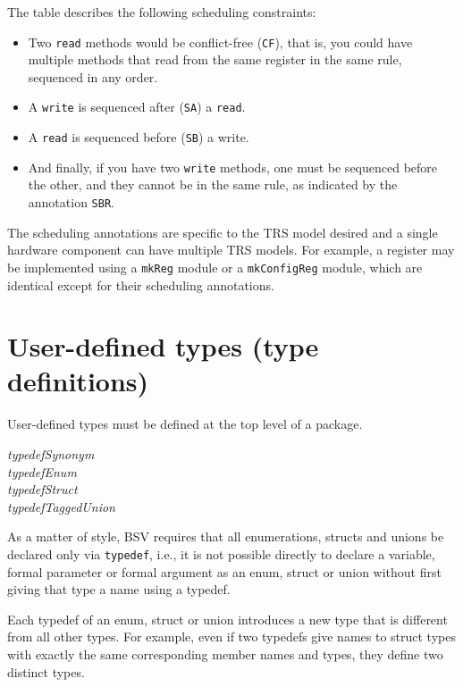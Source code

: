 \documentclass[twoside,letterpaper]{article}
\newcommand{\hm}{\hspace*{1em}}
\newcommand{\BSV}{BSV}
\newcommand{\te}[1]{\texttt{#1}}
\newcommand{\nterm}[1]{\emph{#1}}
\newcommand{\alt}{{$\mid$}}
\newcommand{\gram}[2]{    \hm\makebox[10em][l]{\it #1}\makebox[1.5em][l]{::=}    #2}
\newcommand{\gramalt}[1]{ \hm\makebox[10em][l]{      }\makebox[1.5em][l]{\alt}   #1}
\begin{document}
The table  describes the following scheduling constraints:
\begin{itemize}
\item Two \te{read} methods would be
conflict-free (\te{CF}), that is, you could have multiple methods that
read from the same register in the same rule, sequenced in any order.
\item A \te{write} is sequenced  after (\te{SA}) a \te{read}.
\item A \te{read} is sequenced before (\te{SB}) a write. 
\item And
finally, if you have two \te{write} methods, one must be sequenced
before the other, and they cannot be in the same rule, as indicated by
the annotation \te{SBR}.  
\end{itemize}

The scheduling annotations are specific to the TRS model desired and a
single hardware component can have multiple TRS models.  For example,
a register may be implemented using a \te{mkReg} module or a
\te{mkConfigReg} module, which are identical except for their
scheduling annotations.  

\section{User-defined types (type definitions)}

\label{sec-typedefs}
\index{typedef@\te{typedef} (keyword)}

User-defined types must be defined at the top level of  a package.

\gram{typeDef}{ \nterm{typedefSynonym} } \\
\gramalt      { \nterm{typedefEnum} }    \\
\gramalt      { \nterm{typedefStruct} }  \\
\gramalt      { \nterm{typedefTaggedUnion} }

As a matter of style, {\BSV} requires that all enumerations, structs
and unions be declared only via \texttt{typedef}, i.e., it is not possible
directly to declare a variable, formal parameter or formal argument as
an enum, struct or union without first giving that type a name using a
typedef.

Each typedef of an enum, struct or union introduces a new type that is
different from all other types.  For example, even if two typedefs
give names to struct types with exactly the same corresponding member
names and types, they define two distinct types.
\end{document}
